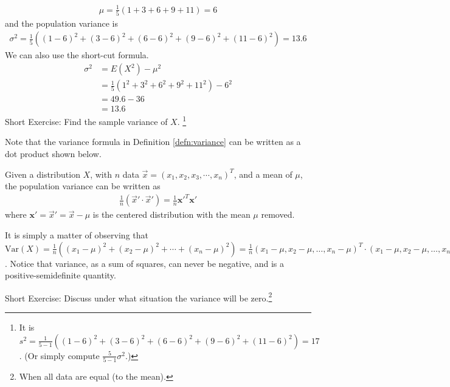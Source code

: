 \begin{align*}
\mu = \frac{1}{5}(1 + 3 + 6 + 9 + 11) = 6
\end{align*}
and the population variance is
\begin{align*}
\sigma^2 = \frac{1}{5}((1-6)^2 + (3-6)^2 + (6-6)^2 + (9-6)^2 + (11-6)^2) = 13.6
\end{align*}
We can also use the short-cut formula.
\begin{align*}
\sigma^2 &= E(X^2) - \mu^2 \\
&= \frac{1}{5} (1^2 + 3^2 + 6^2 + 9^2 + 11^2) - 6^2 \\
&= 49.6 - 36 \\
&= 13.6
\end{align*}
Short Exercise: Find the sample variance of $X$. \footnote{It is $s^2 = \frac{1}{5-1}((1-6)^2 + (3-6)^2 + (6-6)^2 + (9-6)^2 + (11-6)^2) = 17$. (Or simply compute $\frac{5}{5-1}\sigma^2$.)} \par
Note that the variance formula in Definition \ref{defn:variance} can be written as a dot product shown below.
\begin{proper}
Given a distribution $X$, with $n$ data $\vec{x} = (x_1, x_2, x_3, \cdots, x_n)^T$, and a mean of $\mu$, the population variance can be written as
\begin{align*}
\frac{1}{n} (\vec{x}'\cdot\vec{x}') = \frac{1}{n} \textbf{x}'^T \textbf{x}'
\end{align*}
where $\textbf{x}' = \vec{x}' = \vec{x} - \mu$ is the centered distribution with the mean $\mu$ removed.
\end{proper}
It is simply a matter of observing that $\text{Var}(X) = \frac{1}{n} ((x_1 - \mu)^2 + (x_2 - \mu)^2 + \cdots + (x_n - \mu)^2) = \frac{1}{n} (x_1 - \mu, x_2 - \mu, \ldots, x_n - \mu)^T \cdot (x_1 - \mu, x_2 - \mu, \ldots, x_n - \mu)^T$. Notice that variance, as a sum of squares, can never be negative, and is a positive-semidefinite quantity. \par
Short Exercise: Discuss under what situation the variance will be zero.\footnote{When all data are equal (to the mean).}

